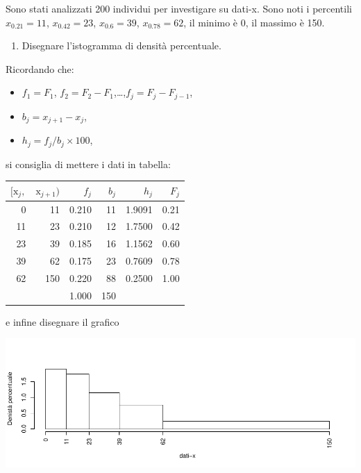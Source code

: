 \documentclass[
  11pt,
]{book}
\providecommand{\tightlist}{%
  \setlength{\itemsep}{0pt}\setlength{\parskip}{0pt}}
\theoremstyle{mytheoremstyle}
\theoremstyle{mydefstyle}
\newenvironment{sol}
  {
  \begin{tcolorbox}[enhanced,breakable,arc=0.1mm,boxrule=1pt,colback=white,colframe=iblue,
  title=\bf \fontfamily{lmss}\selectfont \hspace{.5 cm} Soluzione,drop fuzzy shadow]

}{
\end{tcolorbox}
  }
\begin{document}
Sono stati analizzati 200 individui per investigare su dati-x. Sono noti i percentili
\(x_{0.21}=11\), \(x_{0.42}=23\), \(x_{0.6}=39\), \(x_{0.78}=62\), il minimo è 0, il massimo è 150.

\begin{enumerate}
\def\labelenumi{\alph{enumi}.}
\tightlist
\item
  Disegnare l'istogramma di densità percentuale.
\end{enumerate}

\begin{sol}

Ricordando che:

\begin{itemize}
\tightlist
\item
  \(f_1=F_1\), \(f_2=F_2-F_1\),\ldots,\(f_j = F_j-F_{j-1}\),
\item
  \(b_j=x_{j+1}-x_{j}\),
\item
  \(h_j=f_j/b_j\times 100\),
\end{itemize}

si consiglia di mettere i dati in tabella:

\begin{table}[H]
\centering
\begin{tabular}{rrrrrr}
\toprule
$[\text{x}_j,$ & $\text{x}_{j+1})$ & $f_j$ & $b_j$ & $h_j$ & $F_j$\\
\midrule
0 & 11 & 0.210 & 11 & 1.9091 & 0.21\\
11 & 23 & 0.210 & 12 & 1.7500 & 0.42\\
23 & 39 & 0.185 & 16 & 1.1562 & 0.60\\
39 & 62 & 0.175 & 23 & 0.7609 & 0.78\\
62 & 150 & 0.220 & 88 & 0.2500 & 1.00\\
 &  & 1.000 & 150 &  & \\
\bottomrule
\end{tabular}
\end{table}

e infine disegnare il grafico

\begin{center}\includegraphics{Esami_passati_con_soluzioni_files/figure-latex/01-descr-10-1} \end{center}

\end{sol}
\end{document}
